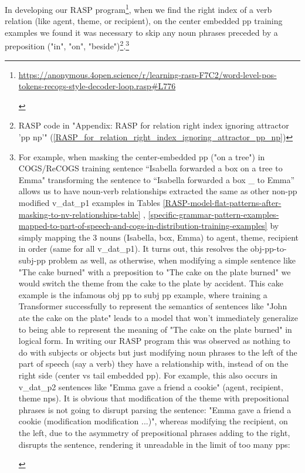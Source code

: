 \documentclass[11pt]{article}
\begin{document}
In developing our RASP program\footnote{\begin{footnotesize}\href{https://anonymous.4open.science/r/learning-rasp-F7C2/word-level-pos-tokens-recogs-style-decoder-loop.rasp\#L776}{https://anonymous.4open.science/r/learning-rasp-F7C2/word-level-pos-tokens-recogs-style-decoder-loop.rasp\#L776}\end{footnotesize}},
when we find the right index of a verb relation (like agent, theme, or recipient), 
on the center embedded pp training examples we found it was necessary to skip any noun phrases preceded by a preposition ("in", "on", "beside")\footnote{RASP code in "Appendix: RASP for relation right index ignoring attractor 'pp np'" (\ref{RASP_for_relation_right_index_ignoring_attractor_pp_np})}.\footnote{\begin{footnotesize}
For example, when masking the center-embedded pp ("on a tree") in COGS/ReCOGS training sentence “Isabella forwarded a box on a tree to Emma" transforming the sentence to “Isabella forwarded a box \_ to Emma” allows us to have noun-verb relationships extracted the same as other non-pp modified v\_dat\_p1 examples in Tables \ref{RASP-model-flat-patterns-after-masking-to-nv-relationships-table} , \ref{specific-grammar-pattern-examples-mapped-to-part-of-speech-and-cogs-in-distribution-training-examples} by simply mapping the 3 nouns (Isabella, box, Emma) to agent, theme, recipient in order (same for all v\_dat\_p1).
It turns out, this resolves the obj-pp-to-subj-pp problem as well, as otherwise, when modifying a simple sentence like "The cake burned" with a preposition to "The cake on the plate burned" we would switch the theme from the cake to the plate by accident. This cake example is the infamous obj pp to subj pp example, where training a Transformer successfully to represent the semantics of sentences like "John ate the cake on the plate" leads to a model that won't immediately generalize to being able to represent the meaning of "The cake on the plate burned" in logical form.
In writing our RASP program this was observed as nothing to do with subjects or objects but just modifying noun phrases to the left of the part of speech (say a verb) they have a relationship with, instead of on the right side (center vs tail embedded pp). For example, this also occurs in v\_dat\_p2 sentences like "Emma gave a friend a cookie" (agent, recipient, theme nps). It is obvious that modification of the theme with prepositional phrases is not going to disrupt parsing the sentence: "Emma gave a friend a cookie (modification modification ...)", whereas modifying the recipient, on the left, due to the asymmetry of prepositional phrases adding to the right, disrupts the sentence, rendering it unreadable in the limit of too many pps:


\end{footnotesize}}
\end{document}
